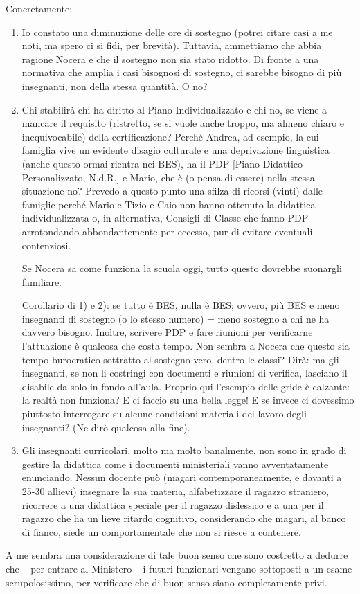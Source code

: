 Concretamente:
\begin{enumerate}
	\item Io constato una diminuzione delle ore di sostegno (potrei citare casi a me noti, ma spero ci si fidi, per brevità). Tuttavia, ammettiamo che abbia ragione Nocera e che il sostegno non sia stato ridotto. Di fronte a una normativa che amplia i casi bisognosi di sostegno, ci sarebbe bisogno di più insegnanti, non della stessa quantità. O no?
	\item Chi stabilirà chi ha diritto al Piano Individualizzato e chi no, se viene a mancare il requisito (ristretto, se si vuole anche troppo, ma almeno chiaro e inequivocabile) della certificazione? Perché Andrea, ad esempio, la cui famiglia vive un evidente disagio culturale e una deprivazione linguistica (anche questo ormai rientra nei BES), ha il PDP [Piano Didattico Personalizzato, N.d.R.] e Mario, che è (o pensa di essere) nella stessa situazione no? Prevedo a questo punto una sfilza di ricorsi (vinti) dalle famiglie perché Mario e Tizio e Caio non hanno ottenuto la didattica individualizzata o, in alternativa, Consigli di Classe che fanno PDP arrotondando abbondantemente per eccesso, pur di evitare eventuali contenziosi.
	
	Se Nocera sa come funziona la scuola oggi, tutto questo dovrebbe suonargli familiare.
	
	Corollario di 1) e 2): se tutto è BES, nulla è BES; ovvero, più BES e meno insegnanti di sostegno (o lo stesso numero) = meno sostegno a chi ne ha davvero bisogno. Inoltre, scrivere PDP e fare riunioni per verificarne l'attuazione è qualcosa che costa tempo. Non sembra a Nocera che questo sia tempo burocratico sottratto al sostegno vero, dentro le classi? Dirà: ma gli insegnanti, se non li costringi con documenti e riunioni di verifica, lasciano il disabile da solo in fondo all'aula. Proprio qui l'esempio delle gride è calzante: la realtà non funziona? E ci faccio su una bella legge! E se invece ci dovessimo piuttosto interrogare su alcune condizioni materiali del lavoro degli insegnanti? (Ne dirò qualcosa alla fine).
	\item Gli insegnanti curricolari, molto ma molto banalmente, non sono in grado di gestire la didattica come i documenti ministeriali vanno avventatamente enunciando. Nessun docente può (magari contemporaneamente, e davanti a 25-30 allievi) insegnare la sua materia, alfabetizzare il ragazzo straniero, ricorrere a una didattica speciale per il ragazzo dislessico e a una per il ragazzo che ha un lieve ritardo cognitivo, considerando che magari, al banco di fianco, siede un comportamentale che non si riesce a contenere.
\end{enumerate}
A me sembra una considerazione di tale buon senso che sono costretto a dedurre che – per entrare al Ministero – i futuri funzionari vengano sottoposti a un esame scrupolosissimo, per verificare che di buon senso siano completamente privi.

